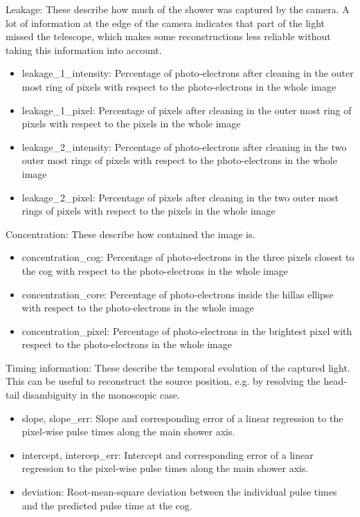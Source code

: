 Leakage:
These describe how much of the shower was captured by the camera.
A lot of information at the edge of the camera indicates that part of the light missed the telescope, 
which makes some reconstructions less reliable without taking this information into account.
\begin{itemize}
    \item{leakage\_1\_intensity: Percentage of photo-electrons after cleaning in the outer most ring of pixels with respect to the photo-electrons in the whole image}
    \item{leakage\_1\_pixel: Percentage of pixels after cleaning in the outer most ring of pixels with respect to the pixels in the whole image}
    \item{leakage\_2\_intensity: Percentage of photo-electrons after cleaning in the two outer most rings of pixels with respect to the photo-electrons in the whole image}
    \item{leakage\_2\_pixel: Percentage of pixels after cleaning in the two outer most rings of pixels with respect to the pixels in the whole image}
\end{itemize}

Concentration:
These describe how contained the image is.
\begin{itemize}
    \item{concentration\_cog: Percentage of photo-electrons in the three pixels closest to the cog with respect to the photo-electrons in the whole image}
    \item{concentration\_core: Percentage of photo-electrons inside the hillas ellipse with respect to the photo-electrons in the whole image}
    \item{concentration\_pixel: Percentage of photo-electrons in the brightest pixel with respect to the photo-electrons in the whole image}
\end{itemize}

Timing information:
These describe the temporal evolution of the captured light.
This can be useful to reconstruct the source position, e.g. by resolving the head-tail disambiguity in the monoscopic case.
\begin{itemize}
    \item{slope, slope\_err: Slope and corresponding  error of a linear regression to the pixel-wise pulse times along the main shower axis.}
    \item{intercept, intercep\_err: Intercept and corresponding  error of a linear regression to the pixel-wise pulse times along the main shower axis.}
    \item{deviation: Root-mean-square deviation between the individual pulse times and the predicted pulse time at the cog.}
\end{itemize}

